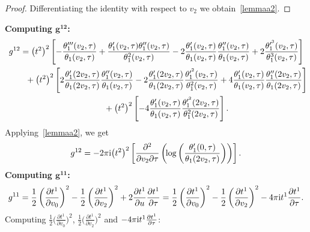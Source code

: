 \documentclass[10pt,a4paper]{amsart}
\numberwithin{equation}{section}
\begin{document}
\begin{proof}
Differentiating the identity \label{idtheta1} with respect to $v_2$ we obtain~\eqref{lemmaa2}.
\end{proof}
\textbf{Computing $\boldsymbol {g^{12}}$:}
\begin{gather*}
g^{12}=\big(t^2\big)^2\left[-\frac{\theta_1^{\prime\prime\prime}(v_2,\tau)}{\theta_1(v_2,\tau)} +\frac{\theta_1^{\prime}(v_2,\tau)\theta_1^{\prime\prime}(v_2,\tau)}{\theta_1^2(v_2,\tau)}
-2\frac{\theta_1^{\prime}(v_2,\tau)}{\theta_1(v_2,\tau)} \frac{\theta_1^{\prime\prime}(v_2,\tau)}{\theta_1(v_2,\tau)} +2\frac{\theta_1^{\prime^3}(v_2,\tau)}{\theta_1^3(v_2,\tau)}\right]
\\ \hphantom{g^{12}=}
{}+\big(t^2\big)^2\left[2\frac{\theta_1^{\prime}(2v_2,\tau)}{\theta_1(2v_2,\tau)} \frac{\theta_1^{\prime\prime}(v_2,\tau)}{\theta_1(v_2,\tau)} -2\frac{\theta_1^{\prime}(2v_2,\tau)}{\theta_1(2v_2,\tau)} \frac{\theta_1^{\prime^2}(v_2,\tau)}{\theta_1^2(v_2,\tau)} +4\frac{\theta_1^{\prime}(v_2,\tau)}{\theta_1(v_2,\tau)} \frac{\theta_1^{\prime\prime}(2v_2,\tau)}{\theta_1(2v_2,\tau)}\right]
\\ \hphantom{g^{12}=}
{}+\big(t^2\big)^2 \left[ - 4\frac{\theta_1^{\prime}(v_2,\tau)}{\theta_1(v_2,\tau)} \frac{\theta_1^{\prime^2}(2v_2,\tau)}{\theta_1^2(2v_2,\tau)}\right].
\end{gather*}
Applying~\eqref{lemmaa2}, we get
\begin{gather*}
g^{12}=-2\pi {\rm i}\big(t^2\big)^2\left[\frac{\partial^2}{\partial v_2\partial \tau}\left(\!\log\left(\frac{\theta_1^{\prime}(0,\tau)}{\theta_1(2v_2,\tau)}\right)\right)\right].
\end{gather*}
\textbf{Computing $\boldsymbol {g^{11}}$:}
\begin{gather*}
g^{11}=\frac{1}{2}\left(\frac{\partial t^1}{\partial v_0}\right)^2-\frac{1}{2}\left(\frac{\partial t^1}{\partial v_2}\right)^2+2\frac{\partial t^1}{\partial u}\frac{\partial t^1}{\partial \tau}
=\frac{1}{2}\left(\frac{\partial t^1}{\partial v_0}\right)^2-\frac{1}{2}\left(\frac{\partial t^1}{\partial v_2}\right)^2-4\pi {\rm i}t^1\frac{\partial t^1}{\partial \tau}.
\end{gather*}
Computing $\frac{1}{2}\big(\frac{\partial t^1}{\partial v_0}\big)^2$, $\frac{1}{2}\big(\frac{\partial t^1}{\partial v_2}\big)^2$ and $-4\pi {\rm i}t^1\frac{\partial t^1}{\partial \tau}$:
\end{document}
